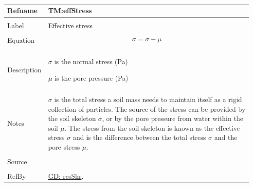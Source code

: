\documentclass[12pt]{article}
\begin{document}
~\newline
 \noindent \begin{minipage}{\textwidth}
\begin{tabular}{p{} p{}}
\toprule \textbf{Refname} & \textbf{TM:effStress}
\label{TM:effStress}
\\ \midrule \\
Label & Effective stress
        \\ \midrule \\
        Equation & \begin{displaymath}
                   σ=σ-μ
                   \end{displaymath}
                   \\ \midrule \\
                   Description & \begin{symbDescription}
                                 \item{$σ$ is the normal stress (Pa)}
                                 \item{$μ$ is the pore pressure (Pa)}
                                 \end{symbDescription}
                                 \\ \midrule \\
                                 Notes & $σ$ is the total stress a soil mass needs to maintain itself as a rigid collection of particles. The source of the stress can be provided by the soil skeleton $σ$, or by the pore pressure from water within the soil $μ$. The stress from the soil skeleton is known as the effective stress $σ$ and is the difference between the total stress $σ$ and the pore stress $μ$.
                                         \\ \midrule \\
                                         Source & \cite{fredlund1977}
                                                  \\ \midrule \\
                                                  RefBy & \hyperref[GD:resShr]{GD: resShr}.
\\ \bottomrule \end{tabular}
\end{minipage}\\
\end{document}
